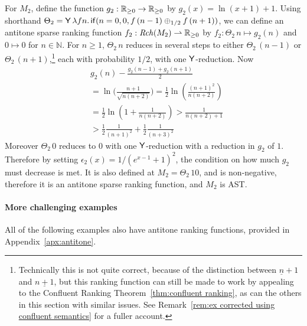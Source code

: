 \begin{example}
\label{ex:unbiased random walk}
For $M_2$, define the function $g_2 : \mathbb{R}_{{\geq}0} \to \mathbb{R}_{{\geq}0}$ by $g_2(x) = \ln(x+1) + 1$.
Using shorthand 
$\Theta_2 = \mathsf{Y} \, \lambda f n . \, 
\mathsf{if}(n = 0, 0, f \, (n - 1) \oplus_{1/2} f \, (n + 1))$, 
we can define an antitone sparse ranking function $f_2 : \mathit{Rch}(M_2) \rightharpoonup \mathbb{R}_{{\geq}0}$ 
by
\(
f_2: {\Theta_2} \, n \mapsto 
g_2(n)
\)
and
$0 \mapsto 0$
for $n \in \mathbb N$.
For $n \geq 1$, $\Theta_2 \, n$ reduces in several steps to either $\Theta_2 \, (n-1)$ or $\Theta_2 \, (n+1)$,\footnote{Technically this is not quite correct, because of the distinction between $\underline n + 1$ and $\underline{n + 1}$, but this ranking function can still be made to work by appealing to the Confluent Ranking Theorem~\ref{thm:confluent ranking}, as can the others in this section with similar issues. See Remark~\ref{rem:ex corrected using confluent semantics} for a fuller account.} each with probability $1/2$, with one $\mathsf{Y}$-reduction.
Now
\begin{align*}%
& g_2(n) - \frac{g_2(n-1) + g_2(n+1)} 2 \\
  &=  \ln \Big(\frac{n+1}{\sqrt{n(n+2)}}\Big) 
  =  \frac 1 2 \ln\left(\frac{(n+1)^2}{n(n+2)}\right) \\
  &=  \frac 1 2 \ln\left(1 + \frac 1 {n(n+2)}\right) 
  >  \frac 1 {n(n+2) + 1} \\
  &>  \frac 1 2 \frac 1 {(n+1)^2} + \frac 1 2 \frac 1 {(n+3)^2}
\end{align*}
Moreover $\Theta_2 \, 0$ reduces to $0$ with one $\mathsf{Y}$-reduction with a reduction in $g_2$ of $1$.
Therefore by setting $\epsilon_2(x) = 1 / {(e^{x-1}+1)^2}$, the condition on how much $g_2$ must decrease is met. It is also defined at $M_2 = \Theta_2 \, 10$, and is non-negative, therefore it is an antitone sparse ranking function, and $M_2$ is AST.
\end{example}

\paragraph*{More challenging examples} All of the following examples also have antitone ranking functions, provided in Appendix~\ref{apx:antitone}.

